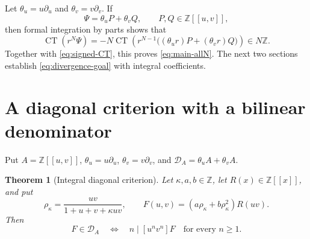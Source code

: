 \documentclass[11pt,a4paper]{article}
\numberwithin{equation}{section}
\newtheorem{theorem}{Theorem}[section]
\theoremstyle{remark}
\newcommand{\Z}{\mathbb Z}
\newcommand{\CT}{\operatorname{CT}}
\begin{document}
Let \(\theta_u=u\partial_u\) and \(\theta_v=v\partial_v\).
If
\begin{equation}\label{eq:divergence-goal}
             \Psi=\theta_u P+\theta_v Q,
                 \qquad P,Q\in\Z[[u,v]],
\end{equation}
then formal integration by parts shows that
\[
 \CT(r^N\Psi)
 =-N\CT\left(r^{N-1}
       \bigl((\theta_u r)P+(\theta_v r)Q\bigr)\right)\in N\Z.
\]
Together with \eqref{eq:signed-CT}, this proves
\eqref{eq:main-allN}. The next two sections establish
\eqref{eq:divergence-goal} with integral coefficients.


\section{A diagonal criterion with a bilinear denominator}

Put $A=\mathbb Z[[u,v]]$, $\theta_u=u\partial_u$,
$\theta_v=v\partial_v$, and
$\mathcal D_A=\theta_u A+\theta_v A$.

\begin{theorem}[Integral diagonal criterion]\label{thm:diag-criterion}
Let $\kappa,a,b\in\mathbb Z$, let $R(x)\in\mathbb Z[[x]]$, and put
\[
 \rho_\kappa=\frac{uv}{1+u+v+\kappa uv},\qquad
 F(u,v)=(a\rho_\kappa+b\rho_\kappa^2)R(uv).
\]
Then
\[
 F\in\mathcal D_A
 \quad\Longleftrightarrow\quad
 n\mid[u^nv^n]F\quad\text{for every }n\ge1.
\]
\end{theorem}
\end{document}
